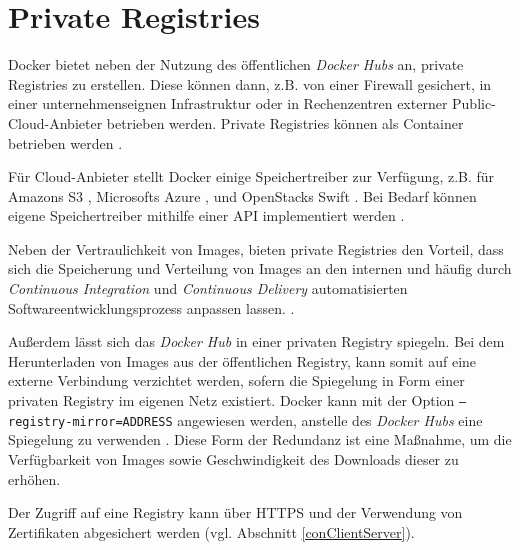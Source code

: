 \documentclass[../main.tex]{subfiles}
\begin{document}


  \section{Private Registries}
    Docker bietet neben der Nutzung des öffentlichen \emph{Docker Hubs} an, private Registries zu erstellen. Diese können dann, z.B. von einer Firewall gesichert, in einer unternehmenseignen Infrastruktur oder in Rechenzentren externer Public-Cloud-Anbieter betrieben werden. Private Registries können als Container betrieben werden \cite{dockerRegistry}.

    Für Cloud-Anbieter stellt Docker einige Speichertreiber zur Verfügung, z.B. für Amazons S3 \cite{dockerStorageDriverS3}, Microsofts Azure \cite{dockerStorageDriverAzure}, und OpenStacks Swift \cite{dockerStorageDriverSwift}. Bei Bedarf können eigene Speichertreiber mithilfe einer API implementiert werden \cite{dockerStorageDriver}.

    Neben der Vertraulichkeit von Images, bieten private Registries den Vorteil, dass sich die Speicherung und Verteilung von Images an den internen und häufig durch \emph{Continuous Integration} und \emph{Continuous Delivery} automatisierten Softwareentwicklungsprozess anpassen lassen. .

    Außerdem lässt sich das \emph{Docker Hub} in einer privaten Registry spiegeln. Bei dem Herunterladen von Images aus der öffentlichen Registry, kann somit auf eine externe Verbindung verzichtet werden, sofern die Spiegelung in Form einer privaten Registry im eigenen Netz existiert. Docker kann mit der Option \texttt{--registry-mirror=ADDRESS} angewiesen werden, anstelle des \emph{Docker Hubs} eine Spiegelung zu verwenden \cite{dockerRegistryMirror}. Diese Form der Redundanz ist eine Maßnahme, um die Verfügbarkeit von Images sowie Geschwindigkeit des Downloads dieser zu erhöhen.

    Der Zugriff auf eine Registry kann über \acrshort{HTTPS} und der Verwendung von Zertifikaten abgesichert werden \cite{dockerRegistry} (vgl. Abschnitt \ref{conClientServer}).
\end{document}
